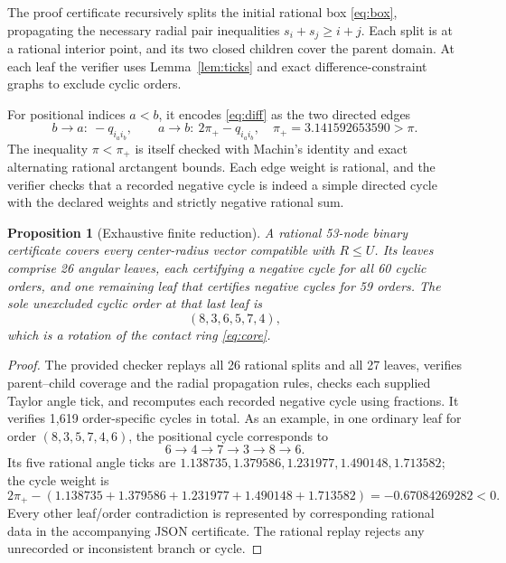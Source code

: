 \documentclass[10pt,a4paper]{article}
\newtheorem{proposition}[theorem]{Proposition}
\newcommand{\Rcap}{U}
\begin{document}
The proof certificate recursively splits the initial rational box \eqref{eq:box}, propagating the necessary radial pair inequalities $s_i+s_j\ge i+j$. Each split is at a rational interior point, and its two closed children cover the parent domain. At each leaf the verifier uses Lemma~\ref{lem:ticks} and exact difference-constraint graphs to exclude cyclic orders.

For positional indices $a<b$, it encodes \eqref{eq:diff} as the two directed edges
\begin{equation}\label{eq:weights}
 b\longrightarrow a:\ -q_{i_ai_b},\qquad
 a\longrightarrow b:\ 2\pi_+-q_{i_ai_b},
 \quad\pi_+=3.141592653590>\pi.
\end{equation}
The inequality $\pi<\pi_+$ is itself checked with Machin's identity and exact alternating rational arctangent bounds. Each edge weight is rational, and the verifier checks that a recorded negative cycle is indeed a simple directed cycle with the declared weights and strictly negative rational sum.

\begin{proposition}[Exhaustive finite reduction]\label{prop:tree}
A rational 53-node binary certificate covers every center-radius vector compatible with $R\le\Rcap$. Its leaves comprise 26 angular leaves, each certifying a negative cycle for all 60 cyclic orders, and one remaining leaf that certifies negative cycles for 59 orders. The sole unexcluded cyclic order at that last leaf is
\begin{equation}\label{eq:last}
 (8,3,6,5,7,4),
\end{equation}
which is a rotation of the contact ring \eqref{eq:core}.
\end{proposition}
\begin{proof}
The provided checker replays all 26 rational splits and all 27 leaves, verifies parent--child coverage and the radial propagation rules, checks each supplied Taylor angle tick, and recomputes each recorded negative cycle using fractions. It verifies 1,619 order-specific cycles in total. As an example, in one ordinary leaf for order $(8,3,5,7,4,6)$, the positional cycle corresponds to
\[
6\to4\to7\to3\to8\to6.
\]
Its five rational angle ticks are $1.138735,1.379586,1.231977,1.490148,1.713582$; the cycle weight is
\[
 2\pi_+-(1.138735+1.379586+1.231977+1.490148+1.713582)
 =-0.67084269282<0.
\]
Every other leaf/order contradiction is represented by corresponding rational data in the accompanying JSON certificate. The rational replay rejects any unrecorded or inconsistent branch or cycle.
\end{proof}
\end{document}
